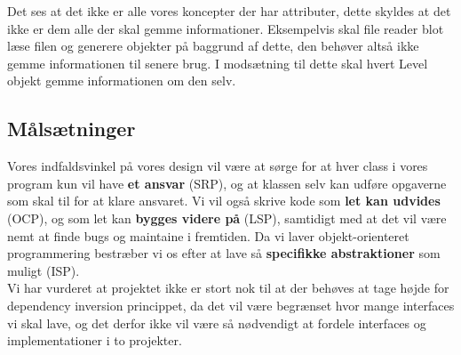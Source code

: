 Det ses at det ikke er alle vores koncepter der har attributer, dette skyldes at det ikke er dem alle der skal gemme informationer. Eksempelvis skal file reader blot læse filen og generere objekter på baggrund af dette, den behøver altså ikke gemme informationen til senere brug. I modsætning til dette skal hvert Level objekt gemme informationen om den selv.

\subsection{Målsætninger}
   Vores indfaldsvinkel på vores design vil være at sørge for at hver class i vores program kun vil have \textbf{et ansvar} (SRP), og at klassen selv kan udføre opgaverne som skal til for at klare ansvaret. Vi vil også skrive kode som \textbf{let kan udvides} (OCP), og som let kan \textbf{bygges videre på} (LSP), samtidigt med at det vil være nemt at finde bugs og maintaine i fremtiden. Da vi laver objekt-orienteret programmering bestræber vi os efter at lave så \textbf{specifikke abstraktioner} som muligt (ISP).\\
   Vi har vurderet at projektet ikke er stort nok til at der behøves at tage højde for dependency inversion princippet, da det vil være begrænset hvor mange interfaces vi skal lave, og det derfor ikke vil være så nødvendigt at fordele interfaces og implementationer i to projekter. 